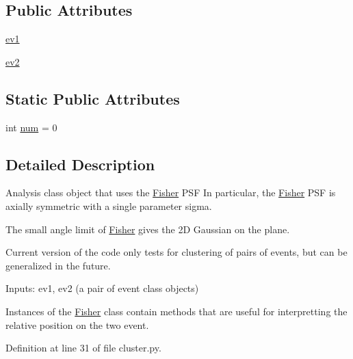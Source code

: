 \subsection*{Public Attributes}
\begin{DoxyCompactItemize}
\item 
\hyperlink{classamonpy_1_1anal_1_1cluster_1_1_fisher__doublet_a1421a238d0bc041660112765c9002aee}{ev1}
\item 
\hyperlink{classamonpy_1_1anal_1_1cluster_1_1_fisher__doublet_a39eca776dc7164dfcf774da12537fbe4}{ev2}
\end{DoxyCompactItemize}
\subsection*{Static Public Attributes}
\begin{DoxyCompactItemize}
\item 
int \hyperlink{classamonpy_1_1anal_1_1cluster_1_1_fisher__doublet_adcbadc44ade386a15365bcf018643e7b}{num} = 0
\end{DoxyCompactItemize}


\subsection{Detailed Description}
Analysis class object that uses the \hyperlink{classamonpy_1_1anal_1_1cluster_1_1_fisher}{Fisher} P\-S\-F In particular, the \hyperlink{classamonpy_1_1anal_1_1cluster_1_1_fisher}{Fisher} P\-S\-F is axially symmetric with a single parameter sigma. 

The small angle limit of \hyperlink{classamonpy_1_1anal_1_1cluster_1_1_fisher}{Fisher} gives the 2\-D Gaussian on the plane.

Current version of the code only tests for clustering of pairs of events, but can be generalized in the future.

Inputs\-: ev1, ev2 (a pair of event class objects)

Instances of the \hyperlink{classamonpy_1_1anal_1_1cluster_1_1_fisher}{Fisher} class contain methods that are useful for interpretting the relative position on the two event. 

Definition at line 31 of file cluster.\-py.



